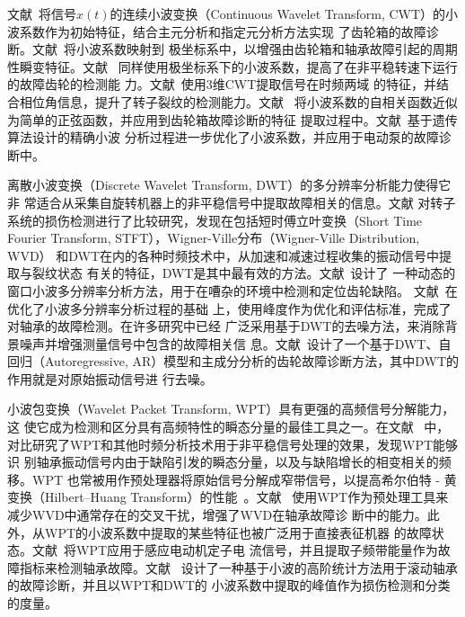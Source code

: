 文献~将信号$x(t)$的连续小波变换（Continuous Wavelet
Transform, CWT）的小波系数作为初始特征，结合主元分析和指定元分析方法实现
了齿轮箱的故障诊断。文献~将小波系数映射到
极坐标系中，以增强由齿轮箱和轴承故障引起的周期性瞬变特征。文献~
同样使用极坐标系下的小波系数，提高了在非平稳转速下运行的故障齿轮的检测能
力。文献~使用3维CWT提取信号在时频两域
的特征，并结合相位角信息，提升了转子裂纹的检测能力。文献~
将小波系数的自相关函数近似为简单的正弦函数，并应用到齿轮箱故障诊断的特征
提取过程中。文献~基于遗传算法设计的精确小波
分析过程进一步优化了小波系数，并应用于电动泵的故障诊断中。

离散小波变换（Discrete Wavelet Transform, DWT）的多分辨率分析能力使得它非
常适合从采集自旋转机器上的非平稳信号中提取故障相关的信息。文献
对转子系统的损伤检测进行了比较研究，发现在包括短时傅立叶变换（Short Time
Fourier Transform, STFT），Wigner-Ville分布（Wigner-Ville Distribution, WVD）
和DWT在内的各种时频技术中，从加速和减速过程收集的振动信号中提取与裂纹状态
有关的特征，DWT是其中最有效的方法。文献~设计了
一种动态的窗口小波多分辨率分析方法，用于在嘈杂的环境中检测和定位齿轮缺陷。
文献~在优化了小波多分辨率分析过程的基础
上，使用峰度作为优化和评估标准，完成了对轴承的故障检测。在许多研究中已经
广泛采用基于DWT的去噪方法，来消除背景噪声并增强测量信号中包含的故障相关信
息。文献~设计了一个基于DWT、自回归（Autoregressive,
AR）模型和主成分分析的齿轮故障诊断方法，其中DWT的作用就是对原始振动信号进
行去噪。

小波包变换（Wavelet Packet Transform, WPT）具有更强的高频信号分解能力，这
使它成为检测和区分具有高频特性的瞬态分量的最佳工具之一。在文献~
中，对比研究了WPT和其他时频分析技术用于非平稳信号处理的效果，发现WPT能够识
别轴承振动信号内由于缺陷引发的瞬态分量，以及与缺陷增长的相变相关的频移。WPT
也常被用作预处理器将原始信号分解成窄带信号，以提高希尔伯特 - 黄变换（Hilbert–Huang
Transform）的性能~\cite{peng2005comparison}。文献~
使用WPT作为预处理工具来减少WVD中通常存在的交叉干扰，增强了WVD在轴承故障诊
断中的能力。此外，从WPT的小波系数中提取的某些特征也被广泛用于直接表征机器
的故障状态。文献~将WPT应用于感应电动机定子电
流信号，并且提取子频带能量作为故障指标来检测轴承故障。文献~
设计了一种基于小波的高阶统计方法用于滚动轴承的故障诊断，并且以WPT和DWT的
小波系数中提取的峰值作为损伤检测和分类的度量。

